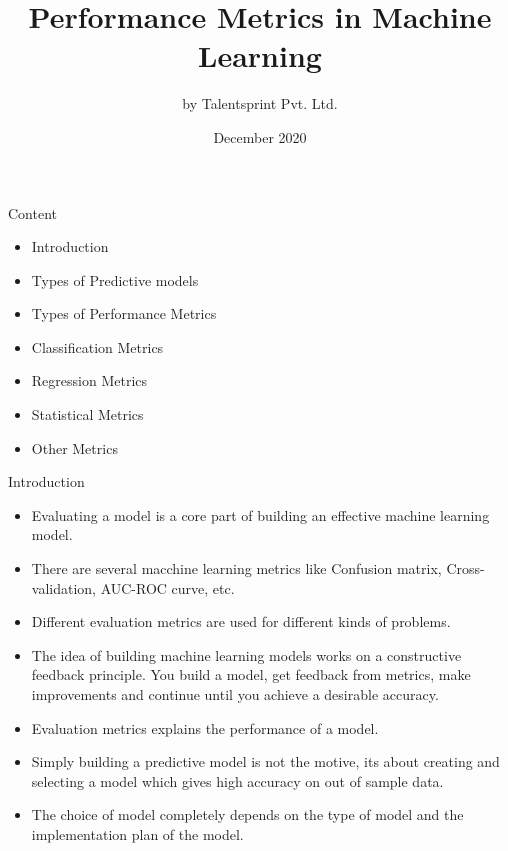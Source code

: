 \documentclass{beamer}
\title{Performance Metrics in Machine Learning}
\author{by Talentsprint Pvt. Ltd.}
\date{December 2020}
\begin{document}
\maketitle
\begin{frame}{Content}
	\begin{itemize}
		\item Introduction
		\item Types of Predictive models
		\item Types of Performance Metrics
		\item Classification Metrics
		\item Regression Metrics
		\item Statistical Metrics
		\item Other Metrics
	\end{itemize}
\end{frame}

\begin{frame}{Introduction}
	\begin{flushleft}
		\begin{itemize}
			\item Evaluating a model is a core part of building an effective machine learning model.
			\item There are several macchine learning metrics like Confusion matrix, Cross-validation, AUC-ROC curve, etc.
			\item Different evaluation metrics are used for different kinds of problems.
			\item The idea of building machine learning models works on a constructive feedback principle. You build a model, get feedback from metrics, make improvements and continue until you achieve a desirable accuracy.
			\item Evaluation metrics explains the performance of a model.
			\item Simply building a predictive model is not the motive, its about creating and selecting a model which gives high accuracy on out of sample data.
			\item The choice of model completely depends on the type of model and the implementation plan of the model.
		\end{itemize}
	\end{flushleft}
\end{frame}
\end{document}
